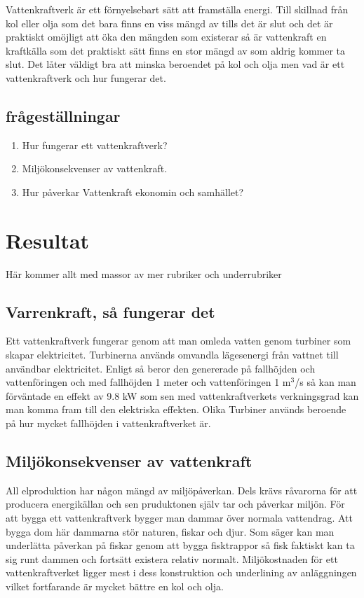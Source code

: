 \documentclass[11p]{article}
\begin{document}
Vattenkraftverk är ett förnyelsebart sätt att framställa energi.
 Till skillnad från kol eller olja som det bara finns en viss mängd av tills det är slut och det är praktiskt omöjligt att öka den mängden som existerar så är vattenkraft en kraftkälla som det praktiskt sätt finns en stor mängd av som aldrig kommer ta slut.
Det låter väldigt bra att minska beroendet på kol och olja men vad är ett vattenkraftverk och hur fungerar det.

 \subsection{frågeställningar}
 \begin{enumerate}
  \item Hur fungerar ett vattenkraftverk?
  \item Miljökonsekvenser av vattenkraft.
  \item Hur påverkar Vattenkraft ekonomin och samhället?
 \end{enumerate}

 \section{Resultat}
 Här kommer allt med massor av mer rubriker och underrubriker
 \subsection{Varrenkraft, så fungerar det}

 Ett vattenkraftverk fungerar genom att man omleda vatten genom turbiner som skapar elektricitet.
 Turbinerna används omvandla lägesenergi från vattnet till användbar elektricitet.
 Enligt \textcite{NE} så beror den genererade på fallhöjden och vattenföringen och med fallhöjden 1 meter och vattenföringen 1 m${^3}$/s så kan man förväntade en effekt av 9.8 kW som sen med vattenkraftverkets verkningsgrad kan man komma fram till den elektriska effekten.
Olika Turbiner används beroende på hur mycket fallhöjden i vattenkraftverket är.

 \subsection{Miljökonsekvenser av vattenkraft}

 All elproduktion har någon mängd av miljöpåverkan. Dels krävs råvarorna för att producera energikällan och sen pruduktonen själv tar och påverkar miljön.
 För att bygga ett vattenkraftverk bygger man dammar över normala vattendrag.
 Att bygga dom här dammarna stör naturen, fiskar och djur.
 Som \textcite{vattenfall} säger kan man underlätta påverkan på fiskar genom att bygga fisktrappor så fisk faktiskt kan ta sig runt dammen och fortsätt existera relativ normalt.
 Miljökostnaden för ett vattenkraftverket ligger mest i dess konstruktion och underlining av anläggningen vilket fortfarande är mycket bättre en kol och olja.
\end{document}

